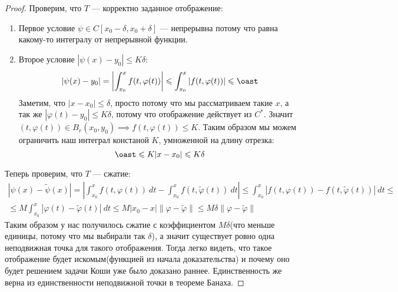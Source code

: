 \begin{proof}
  Проверим, что $T$ --- корректно заданное отображение:
  \begin{enumerate}
    \item Первое условие $\psi \in C[x_0 - \delta, x_0 + \delta]$ --- непрерывна потому что равна какому-то интегралу от непрерывной функции.
    \item Второе условие $|\psi(x) - y_0| \leqslant K \delta$:
    \begin{equation*}
      |\psi(x) - y_0| = 
      \left | \int_{x_0}^{x} f(t, \varphi(t)) \right | \leqslant
      \int_{x_0}^{x} | f(t, \varphi(t)) | \leqslant \oast
    \end{equation*}
    Заметим, что $|x - x_0| \leqslant \delta$, просто потому что мы рассматриваем такие $x$, а так же $| \varphi(t) - y_0 | \leqslant K \delta$, потому что отображение действует из $C^{*}$. Значит $(t, \varphi(t)) \in B_r(x_0, y_0) \implies f(t, \varphi(t)) \leqslant K$. Таким образом мы можем ограничить наш интеграл констаной $K$, умноженной на длину отрезка:
    \begin{equation*}
      \oast \leqslant
      K |x - x_0|
      \leqslant K \delta
    \end{equation*}
  \end{enumerate}
  Теперь проверим, что $T$ --- сжатие:
  \begin{equation*}
    \begin{gathered}
      |\psi(x) - \widetilde{\psi}(x)| =
      \left | \int_{x_0}^{x} f(t, \varphi(t)) \: dt - \int_{x_0}^{x} f(t, \widetilde{\varphi}(t)) \: dt \right | \leqslant
      \int_{x_0}^{x} | f(t, \varphi(t)) - f(t, \widetilde{\varphi}(t)) | \: dt 
      \leqslant \\ \leqslant
      M \int_{x_0}^{x} | \varphi(t) - \widetilde{\varphi}(t)| \: dt \leqslant
      M |x_0 - x| \| \varphi - \widetilde{\varphi} \| \leqslant
      M \delta \| \varphi - \widetilde{\varphi} \|
    \end{gathered}
  \end{equation*}
  Таким образом у нас получилось сжатие с коэффициентом $M\delta$(что меньше единицы, потому что мы выбирали так $\delta$), а значит существует ровно одна неподвижная точка для такого отображения. Тогда легко видеть, что такое отображение будет искомым(функцией из начала доказательства) и почему оно будет решением задачи Коши уже было доказано раннее. Единственность же верна из единственности неподвижной точки в теореме Банаха.
\end{proof}


